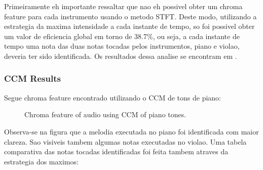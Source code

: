 \documentclass{article}
\begin{document}
	Primeiramente eh importante ressaltar que nao eh possivel obter um chroma feature para cada instrumento usando o metodo STFT. Deste modo, utilizando a estrategia da maxima intensidade a cada instante de tempo, so foi possivel obter um valor de eficiencia global em torno de 38.7\%, ou seja, a cada instante de tempo uma nota das duas notas tocadas pelos instrumentos, piano e violao, deveria ter sido identificada. Os resultados dessa analise se encontram em .

	\subsubsection{CCM Results}
	Segue chroma feature encontrado utilizando o CCM de tons de piano:
	
	\begin{figure}[h]
	 \centerline{}
	 \caption{Chroma feature of audio using CCM of piano tones.}
	 \label{fig:2-ccm-piano}
	\end{figure}	

	Observa-se na figura  que a melodia executada no piano foi identificada com maior clareza. Sao visiveis tambem algumas notas executadas no violao. Uma tabela comparativa das notas tocadas identificadas foi feita tambem atraves da estrategia dos maximos:
\end{document}
